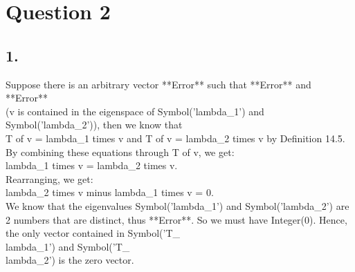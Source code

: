 \documentclass{article}
\begin{document}
\section*{Question 2}
\subsection*{1.}
Suppose there is an arbitrary vector **Error** such that **Error** and **Error** 
\\(v is contained in the eigenspace of Symbol('lambda_1') and Symbol('lambda_2')), then we know that \\ T of v = lambda_1 times v and T of v = lambda_2 times v by Definition 14.5. By combining these equations through T of v, we get:
\\lambda_1 times v = lambda_2 times v. 
\\Rearranging, we get:
\\lambda_2 times v minus lambda_1 times v = 0. 
\\We know that the eigenvalues Symbol('lambda_1') and Symbol('lambda_2') are 2 numbers that are distinct, thus **Error**. So we must have Integer(0). Hence, the only vector contained in Symbol('T_{\\lambda_1}') and Symbol('T_{\\lambda_2}') is the zero vector.
\end{document}
